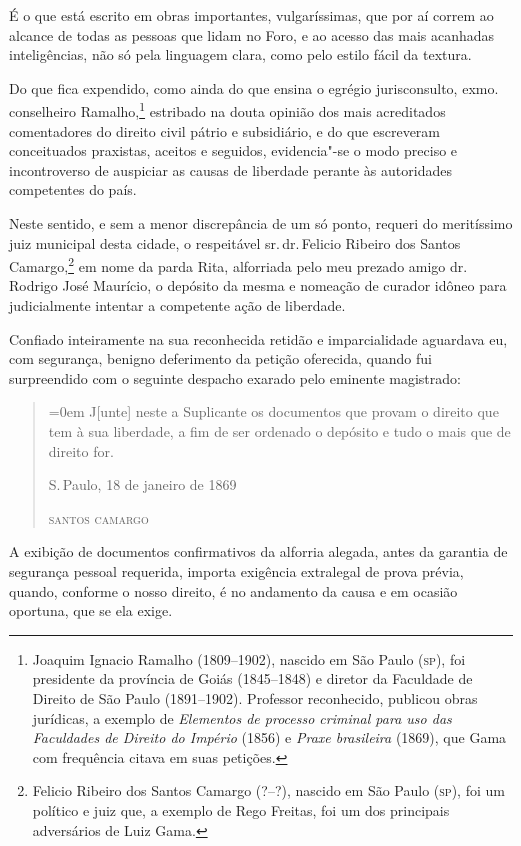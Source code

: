 É o que está escrito em obras importantes, vulgaríssimas, que por aí
correm ao alcance de todas as pessoas que lidam no Foro, e ao acesso das
mais acanhadas inteligências, não só pela linguagem clara, como pelo
estilo fácil da textura.

Do que fica expendido, como ainda do que ensina o egrégio jurisconsulto,
exmo.\,conselheiro Ramalho,\footnote{Joaquim Ignacio Ramalho
  (1809--1902), nascido em São Paulo (\textsc{sp}), foi presidente da província de
  Goiás (1845--1848) e diretor da Faculdade de Direito de São Paulo
  (1891--1902). Professor reconhecido, publicou obras jurídicas, a
  exemplo de \emph{Elementos de processo criminal para uso das
  Faculdades de Direito do Império} (1856) e \emph{Praxe brasileira}
  (1869), que Gama com frequência citava em suas petições.} estribado
na douta opinião dos mais acreditados comentadores do direito civil
pátrio e subsidiário, e do que escreveram conceituados praxistas,
aceitos e seguidos, evidencia"-se o modo preciso e incontroverso de
auspiciar as causas de liberdade perante às autoridades competentes do
país.

Neste sentido, e sem a menor discrepância de um só ponto, requeri do
meritíssimo juiz municipal desta cidade, o respeitável sr.\,dr.\,Felicio
Ribeiro dos Santos Camargo,\footnote{Felicio Ribeiro dos Santos Camargo
  (?--?), nascido em São Paulo (\textsc{sp}), foi um político e juiz que, a
  exemplo de Rego Freitas, foi um dos principais adversários de Luiz
  Gama.} em nome da parda Rita, alforriada pelo meu prezado amigo dr.\,Rodrigo José Maurício, o depósito da mesma e nomeação de curador idôneo
para judicialmente intentar a competente ação de liberdade.

Confiado inteiramente na sua reconhecida retidão e imparcialidade
aguardava eu, com segurança, benigno deferimento da petição oferecida,
quando fui surpreendido com o seguinte despacho exarado pelo eminente
magistrado:

\begin{quote}\parindent=0em
J{[}unte{]} neste a Suplicante os documentos que provam o direito que
tem à sua liberdade, a fim de ser ordenado o depósito e tudo o mais que
de direito for.

S.\,Paulo, 18 de janeiro de 1869

\textsc{santos camargo}
\end{quote}

A exibição de documentos confirmativos da alforria alegada, antes da
garantia de segurança pessoal requerida, importa exigência extralegal de
prova prévia, quando, conforme o nosso direito, é no andamento da causa
e em ocasião oportuna, que se ela exige.

